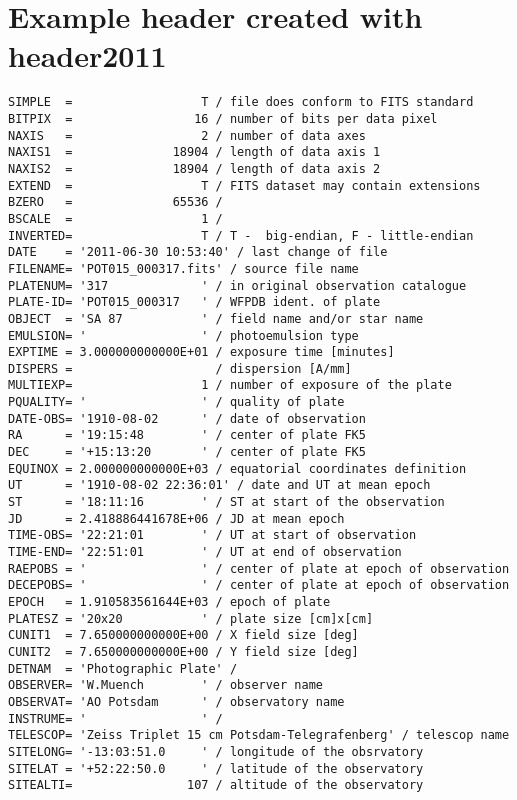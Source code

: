 \documentclass[11pt]{ivoa}
\begin{document}
\section{Example header created with header2011}

\label{sect:platehdr}

\begin{lstlisting}
SIMPLE  =                  T / file does conform to FITS standard
BITPIX  =                 16 / number of bits per data pixel
NAXIS   =                  2 / number of data axes
NAXIS1  =              18904 / length of data axis 1
NAXIS2  =              18904 / length of data axis 2
EXTEND  =                  T / FITS dataset may contain extensions
BZERO   =              65536 /
BSCALE  =                  1 /
INVERTED=                  T / T -  big-endian, F - little-endian
DATE    = '2011-06-30 10:53:40' / last change of file
FILENAME= 'POT015_000317.fits' / source file name
PLATENUM= '317             ' / in original observation catalogue
PLATE-ID= 'POT015_000317   ' / WFPDB ident. of plate
OBJECT  = 'SA 87           ' / field name and/or star name
EMULSION= '                ' / photoemulsion type
EXPTIME = 3.000000000000E+01 / exposure time [minutes]
DISPERS =                    / dispersion [A/mm]
MULTIEXP=                  1 / number of exposure of the plate
PQUALITY= '                ' / quality of plate
DATE-OBS= '1910-08-02      ' / date of observation
RA      = '19:15:48        ' / center of plate FK5
DEC     = '+15:13:20       ' / center of plate FK5
EQUINOX = 2.000000000000E+03 / equatorial coordinates definition
UT      = '1910-08-02 22:36:01' / date and UT at mean epoch
ST      = '18:11:16        ' / ST at start of the observation
JD      = 2.418886441678E+06 / JD at mean epoch
TIME-OBS= '22:21:01        ' / UT at start of observation
TIME-END= '22:51:01        ' / UT at end of observation
RAEPOBS = '                ' / center of plate at epoch of observation
DECEPOBS= '                ' / center of plate at epoch of observation
EPOCH   = 1.910583561644E+03 / epoch of plate
PLATESZ = '20x20           ' / plate size [cm]x[cm]
CUNIT1  = 7.650000000000E+00 / X field size [deg]
CUNIT2  = 7.650000000000E+00 / Y field size [deg]
DETNAM  = 'Photographic Plate' /
OBSERVER= 'W.Muench        ' / observer name
OBSERVAT= 'AO Potsdam      ' / observatory name
INSTRUME= '                ' /
TELESCOP= 'Zeiss Triplet 15 cm Potsdam-Telegrafenberg' / telescop name
SITELONG= '-13:03:51.0     ' / longitude of the obsrvatory
SITELAT = '+52:22:50.0     ' / latitude of the observatory
SITEALTI=                107 / altitude of the observatory

\end{lstlisting}
\end{document}
